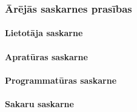 \subsubsection{Ārējās saskarnes prasības}

\paragraph{Lietotāja saskarne}

\paragraph{Apratūras saskarne}

\paragraph{Programmatūras saskarne}

\paragraph{Sakaru saskarne}
